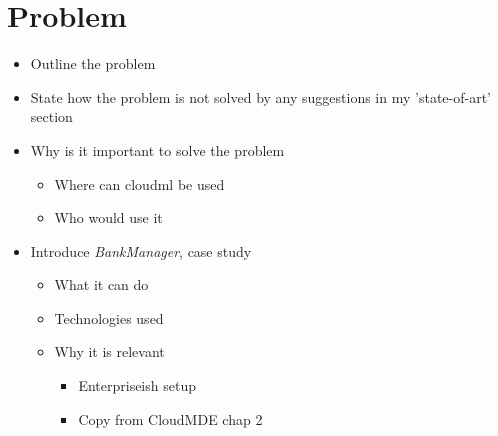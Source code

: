 \section{Problem}

\begin{itemize}
  \item Outline the problem
  \item State how the problem is not solved by any suggestions in my 'state-of-art' section
  \item Why is it important to solve the problem
  \begin{itemize}
    \item Where can cloudml be used
    \item Who would use it
  \end{itemize}
  \item Introduce \emph{BankManager}, case study
  \begin{itemize}
    \item What it can do
    \item Technologies used
    \item Why it is relevant
      \begin{itemize}
        \item Enterpriseish setup
        \item Copy from CloudMDE chap 2
      \end{itemize}
  \end{itemize}
\end{itemize}
